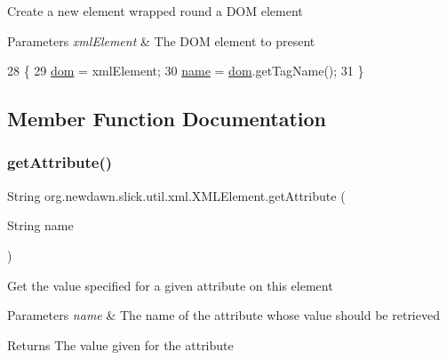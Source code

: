 Create a new element wrapped round a D\+OM element


\begin{DoxyParams}{Parameters}
{\em xml\+Element} & The D\+OM element to present \\
\hline
\end{DoxyParams}

\begin{DoxyCode}
28                                    \{
29         \mbox{\hyperlink{classorg_1_1newdawn_1_1slick_1_1util_1_1xml_1_1_x_m_l_element_a97e3ba0c57e0822e9111fd770807e64e}{dom}} = xmlElement;
30         \mbox{\hyperlink{classorg_1_1newdawn_1_1slick_1_1util_1_1xml_1_1_x_m_l_element_aa96123a88e2614952c4d3d1a4207560a}{name}} = \mbox{\hyperlink{classorg_1_1newdawn_1_1slick_1_1util_1_1xml_1_1_x_m_l_element_a97e3ba0c57e0822e9111fd770807e64e}{dom}}.getTagName();
31     \}
\end{DoxyCode}


\subsection{Member Function Documentation}
\mbox{\label{classorg_1_1newdawn_1_1slick_1_1util_1_1xml_1_1_x_m_l_element_a49543d209f2f2709c8e7a88fac034c69}} 
\subsubsection{\texorpdfstring{get\+Attribute()}{getAttribute()}\hspace{0.1cm}{\footnotesize\ttfamily [1/2]}}
{\footnotesize\ttfamily String org.\+newdawn.\+slick.\+util.\+xml.\+X\+M\+L\+Element.\+get\+Attribute (\begin{DoxyParamCaption}\item[{String}]{name }\end{DoxyParamCaption})\hspace{0.3cm}{\ttfamily [inline]}}

Get the value specified for a given attribute on this element


\begin{DoxyParams}{Parameters}
{\em name} & The name of the attribute whose value should be retrieved \\
\hline
\end{DoxyParams}
\begin{DoxyReturn}{Returns}
The value given for the attribute 
\end{DoxyReturn}

